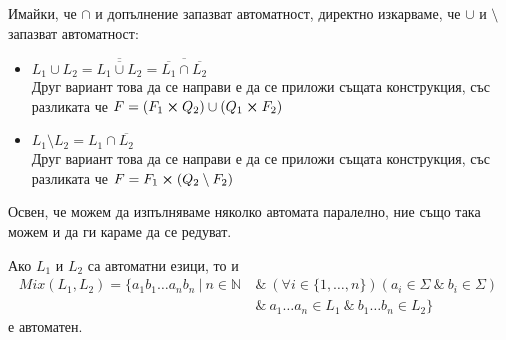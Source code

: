 Имайки, че $\cap$ и допълнение запазват автоматност, директно изкарваме, че $\cup$ и $\setminus$ запазват автоматност:
\begin{itemize}
    \item $L_1 \cup L_2 = \overline{\overline{L_1 \cup L_2}} = \overline{\overline{L_1} \cap \overline{L_2}}$ \\
          Друг вариант това да се направи е да се приложи същата конструкция, със разликата че $F = (F_1 \cross Q_2) \cup (Q_1 \cross F_2)$
    \item $L_1 \setminus L_2 = L_1 \cap \overline{L_2}$ \\
          Друг вариант това да се направи е да се приложи същата конструкция, със разликата че $F = F_1 \cross (Q_2 \setminus F_2)$
\end{itemize}

\pagebreak

Освен, че можем да изпълняваме няколко автомата паралелно, ние също така можем и да ги караме да се редуват.

\begin{claim}
    Ако $L_1$ и $L_2$ са автоматни езици, то и
    \begin{align*}
        Mix(L_1, L_2) = \{ a_1b_1 \dots a_nb_n \: | \: n \in \mathbb{N} \: & \& \: (\forall i \in \{ 1, \dots, n \})(a_i \in \Sigma \: \& \: b_i \in \Sigma) \: \\
                                                                           & \& \: a_1 \dots a_n \in L_1 \: \& \: b_1 \dots b_n \in L_2 \}
    \end{align*}
    е автоматен.
\end{claim}

